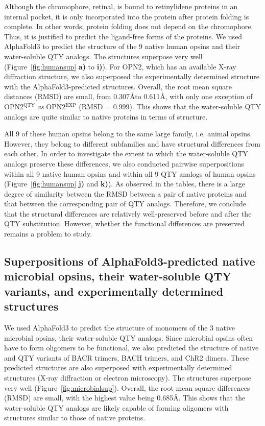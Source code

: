 \documentclass[fleqn, 10pt, lineno]{manuscript}
\begin{document}
Although the chromophore, retinal, is bound to retinylidene proteins in an internal pocket, it is only incorporated into the protein after protein folding is complete. In other words, protein folding does not depend on the chromophore. Thus, it is justified to predict the ligand-free forms of the proteins. We used AlphaFold3 to predict the structure of the 9 native human opsins and their water-soluble QTY analogs. The structures superpose very well (Figure~\ref{fig:humansup} \textbf{a)} to \textbf{i)}). For OPN2, which has an available X-ray diffraction structure, we also superposed the experimentally determined structure with the AlphaFold3-predicted structures. Overall, the root mean square distances (RMSD) are small, from 0.307\AA to 0.611\AA, with only one exception of OPN2$^{\textrm{QTY}}$ \textit{vs} OPN2$^{\textrm{EXP}}$ (RMSD = 0.999). This shows that the water-soluble QTY analogs are quite similar to native proteins in terms of structure. 

All 9 of these human opsins belong to the same large family, i.e. animal opsins. However, they belong to different subfamilies and have structural differences from each other. In order to investigate the extent to which the water-soluble QTY analogs preserve these differences, we also conducted pairwise superpositions within all 9 native human opsins and within all 9 QTY analogs of human opsins (Figure~\ref{fig:humansup} \textbf{j)} and \textbf{k)}). As observed in the tables, there is a large degree of similarity between the RMSD between a pair of native proteins and that between the corresponding pair of QTY analogs. Therefore, we conclude that the structural differences are relatively well-preserved before and after the QTY substitution. However, whether the functional differences are preserved remains a problem to study. 

\subsection*{Superpositions of AlphaFold3-predicted native microbial opsins, their water-soluble QTY variants, and experimentally determined structures}

We used AlphaFold3 to predict the structure of monomers of the 3 native microbial opsins, their water-soluble QTY analogs. Since microbial opsins often have to form oligomers to be functional, we also predicted the structure of native and QTY variants of BACR trimers, BACH trimers, and ChR2 dimers. These predicted structures are also superposed with experimentally determined structures (X-ray diffraction or electron microscopy). The structures superpose very well (Figure~\ref{fig:microbialsup}). Overall, the root mean square differences (RMSD) are small, with the highest value being 0.685\AA. This shows that the water-soluble QTY analogs are likely capable of forming oligomers with structures similar to those of native proteins. 
\end{document}
